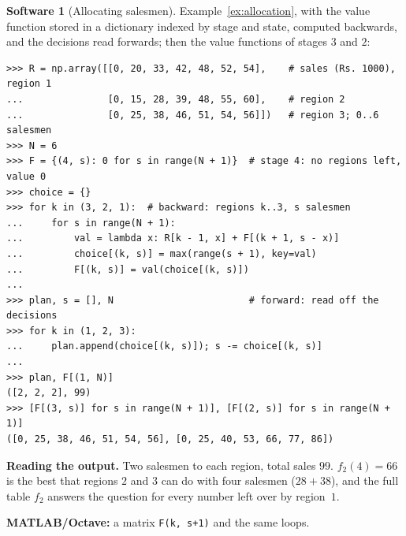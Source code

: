 \documentclass[11pt,a4paper]{article}
\numberwithin{equation}{section}
\theoremstyle{definition}
\newtheorem{software}[thm]{Software}
\begin{document}
\begin{software}[Allocating salesmen]
\label{sw:allocation}
Example~\ref{ex:allocation}, with the value function stored in a dictionary indexed by stage and state, computed backwards, and the decisions read forwards; then the value functions of stages $3$ and $2$:
{\small\begin{verbatim}
>>> R = np.array([[0, 20, 33, 42, 48, 52, 54],    # sales (Rs. 1000), region 1
...               [0, 15, 28, 39, 48, 55, 60],    # region 2
...               [0, 25, 38, 46, 51, 54, 56]])   # region 3; 0..6 salesmen
>>> N = 6
>>> F = {(4, s): 0 for s in range(N + 1)}  # stage 4: no regions left, value 0
>>> choice = {}
>>> for k in (3, 2, 1):  # backward: regions k..3, s salesmen
...     for s in range(N + 1):
...         val = lambda x: R[k - 1, x] + F[(k + 1, s - x)]
...         choice[(k, s)] = max(range(s + 1), key=val)
...         F[(k, s)] = val(choice[(k, s)])
...
>>> plan, s = [], N                        # forward: read off the decisions
>>> for k in (1, 2, 3):
...     plan.append(choice[(k, s)]); s -= choice[(k, s)]
...
>>> plan, F[(1, N)]
([2, 2, 2], 99)
>>> [F[(3, s)] for s in range(N + 1)], [F[(2, s)] for s in range(N + 1)]
([0, 25, 38, 46, 51, 54, 56], [0, 25, 40, 53, 66, 77, 86])
\end{verbatim}}
\textbf{Reading the output.} Two salesmen to each region, total sales $99$. $f_2(4) = 66$ is the best that regions $2$ and $3$ can do with four salesmen ($28 + 38$), and the full table $f_2$ answers the question for every number left over by region~$1$.

\textbf{MATLAB/Octave:} a matrix \texttt{F(k, s+1)} and the same loops.
\end{software}
\end{document}
